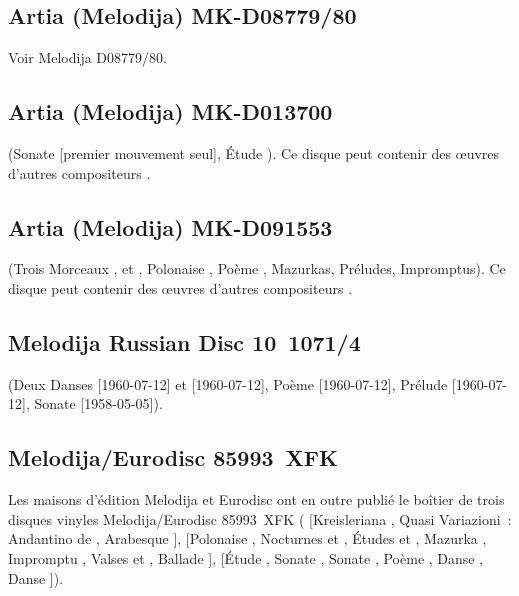 \subsection{Artia (Melodija) MK-D08779/80}

Voir Melodija D08779/80.

\subsection{Artia (Melodija) MK-D013700}

\Scriabine{} (Sonate  [premier mouvement seul], Étude 
).
Ce disque peut contenir des œuvres d'autres compositeurs \citep[voir][p.~94,
note~9]{White}.

\subsection{Artia (Melodija) MK-D091553}

\Scriabine{} (Trois Morceaux  ,   et
 , Polonaise , Poème , Mazurkas,
Préludes, Impromptus).
Ce disque peut contenir des œuvres d'autres compositeurs \citep[voir][p.~94,
note~10]{White}.

\subsection{Melodija Russian Disc 10~1071/4}

\Scriabine{} (Deux Danses   [1960-07-12] et 
 [1960-07-12], Poème   [1960-07-12], Prélude
  [1960-07-12], Sonate  [1958-05-05]).

\subsection{Melodija/Eurodisc 85993~XFK}

Les maisons d'édition Melodija et Eurodisc ont en outre publié le boîtier de
trois disques vinyles Melodija/Eurodisc 85993~XFK (\Schumann{} [Kreisleriana
, Quasi Variazioni~: Andantino de \CWieck{} ,
Arabesque ], \Chopin{} [Polonaise  , Nocturnes
  et  , Études   et
 , Mazurka  , Impromptu ,
Valses   et  , Ballade ],
\Scriabine{} [Étude  , Sonate , Sonate
, Poème  , Danse 
 , Danse   ]).

